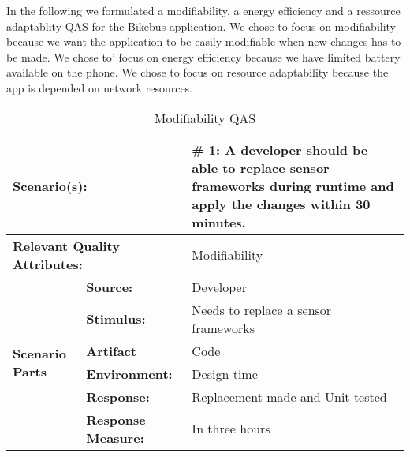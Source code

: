 In the following we formulated a modifiability, a energy efficiency and a ressource adaptablity QAS for the Bikebus application. We chose to focus on modifiability because we want the application to be easily modifiable when new changes has to be made. We chose to' focus on energy efficiency because we have limited battery available on the phone. We chose to focus on resource adaptability because the app is depended on network resources.

\begin{table}[H]
\begin{center}
\begin{tabular}{|p{0.3cm}|p{2.5cm}|p{8cm}|}
  \hline
  \multicolumn{2}{|p{3cm}|}{\bfseries Scenario(s):} & \#  1: A developer should be able to replace sensor frameworks during runtime and apply the changes within 30 minutes. \\
  \hline
  \multicolumn{2}{|p{3cm}|}{\bfseries Relevant Quality Attributes:} & Modifiability\\
  \hline
  \multirow{6}{*}{\begin{sideways}{\bfseries Scenario Parts}\end{sideways}}
  & {\bfseries Source:} & Developer \\
  \cline{2-3}
  & {\bfseries Stimulus:} & Needs to replace a sensor frameworks \\
  \cline{2-3}
  & {\bfseries Artifact} &  Code \\
  \cline{2-3}
  & {\bfseries Environment:} &  Design time \\
  \cline{2-3}
  & {\bfseries Response:} &  Replacement made and Unit tested\\
  \cline{2-3}
  & {\bfseries Response Measure:} & In three hours\\
  \hline
\end{tabular}
\caption{Modifiability QAS}
\end{center}
\end{table}



